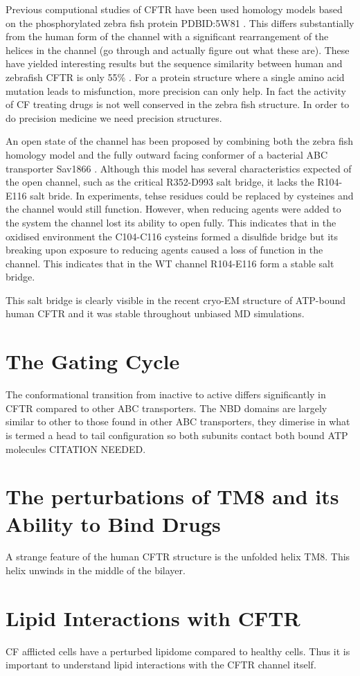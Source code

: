 Previous computional studies of CFTR have been used homology models based on the phosphorylated zebra fish protein PDBID:5W81 \cite{Zhang2017}. This differs substantially from the human form of the channel with a significant rearrangement of the helices in the channel (go through and actually figure out what these are). These have yielded interesting results but the sequence similarity between human and zebrafish CFTR is only 55\% \cite{}. For a protein structure where a single amino acid mutation leads to misfunction, more precision can only help. In fact the activity of CF treating drugs is not well conserved in the zebra fish structure. In order to do precision medicine we need precision structures. 

An open state of the channel has been proposed by combining both the zebra fish homology model and the fully outward facing conformer of a bacterial ABC transporter Sav1866 \cite{Hoffman2018}. Although this model has several characteristics expected of the open channel, such as the critical R352-D993 salt bridge, it lacks the R104-E116 salt bride. In experiments, tehse residues could be replaced by cysteines and the channel would still function. However, when reducing agents were added to the system the channel lost its ability to open fully. This indicates that in the oxidised environment the C104-C116 cysteins formed a disulfide bridge but its breaking upon exposure to reducing agents caused a loss of function in the channel. This indicates that in the WT channel R104-E116 form a stable salt bridge. 

This salt bridge is clearly visible in the recent cryo-EM structure of ATP-bound human CFTR \cite{Zhang2018} and it was stable throughout unbiased MD simulations.

\section{The Gating Cycle}
The conformational transition from inactive to active differs significantly in CFTR compared to other ABC transporters. The NBD domains are largely similar to other to those found in other ABC transporters, they dimerise in what is termed a head to tail configuration so both subunits contact both bound ATP molecules CITATION NEEDED.

\section{The perturbations of TM8 and its Ability to Bind Drugs}
A strange feature of the human CFTR structure is the unfolded helix TM8. This helix unwinds in the middle of the bilayer. 



\section{Lipid Interactions with CFTR}
CF afflicted cells have a perturbed lipidome compared to healthy cells.\cite{Cottrill2020} Thus it is important to understand lipid interactions with the CFTR channel itself.
